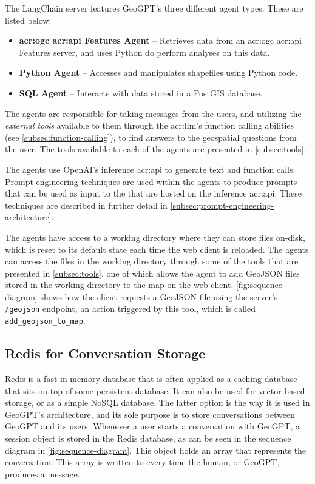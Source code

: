 The LangChain server features GeoGPT's three different agent types. These are listed below:

\begin{itemize}
    \item \textbf{\acrshort{acr:ogc} \acrshort{acr:api} Features Agent} -- Retrieves data from an \acrshort{acr:ogc} \acrshort{acr:api} Features server, and uses Python do perform analyses on this data.
    \item \textbf{Python Agent} -- Accesses and manipulates shapefiles using Python code.
    \item \textbf{SQL Agent} -- Interacts with data stored in a PostGIS database.
\end{itemize}

The agents are responsible for taking messages from the users, and utilizing the \textit{external tools} available to them through the \acrshort{acr:llm}'s function calling abilities (see \autoref{subsec:function-calling}), to find answers to the geospatial questions from the user. The tools available to each of the agents are presented in \autoref{subsec:tools}.

The agents use OpenAI's inference \acrshort{acr:api} to generate text and function calls. Prompt engineering techniques are used within the agents to produce prompts that can be used as input to the  that are hosted on the inference \acrshort{acr:api}. These techniques are described in further detail in \autoref{subsec:prompt-engineering-architecture}.

The agents have access to a working directory where they can store files on-disk, which is reset to its default state each time the web client is reloaded. The agents can access the files in the working directory through some of the tools that are presented in \autoref{subsec:tools}, one of which allows the agent to add GeoJSON files stored in the working directory to the map on the web client. \autoref{fig:sequence-diagram} shows how the client requests a GeoJSON file using the server's \texttt{/geojson} endpoint, an action triggered by this tool, which is called \texttt{add\_geojson\_to\_map}.


\subsection{Redis for Conversation Storage}
\label{subsec:redis-architecture}

Redis \citep{sanfilippoRedisRealtimeData2009} is a fast in-memory database that is often applied as a caching database that sits on top of some persistent database. It can also be used for vector-based storage, or as a simple NoSQL database. The latter option is the way it is used in GeoGPT's architecture, and its sole purpose is to store conversations between GeoGPT and its users. Whenever a user starts a conversation with GeoGPT, a session object is stored in the Redis database, as can be seen in the sequence diagram in \autoref{fig:sequence-diagram}. This object holds an array that represents the conversation. This array is written to every time the human, or GeoGPT, produces a message.

